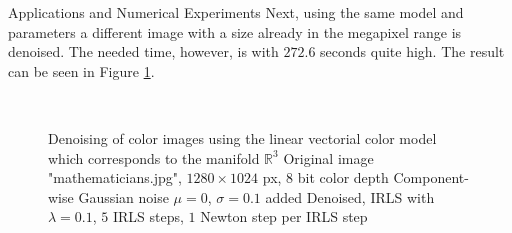 \begin{chapter}{Applications and Numerical Experiments}
Next, using the same model and parameters a different image with a size already in the megapixel range is denoised. The needed
time, however, is with $272.6$ seconds quite high. The result can be seen in Figure \ref{fig:application_color2}.\\

\begin{figure}[h!]
    \centering
    \\
    \caption[Large image "mathematicians" linear-vectorial denoising]{Denoising of color images using the linear vectorial color model which corresponds to the manifold $\mathbb{R}^3$
	 Original image "mathematicians.jpg", $1280\times 1024$ px, 8 bit color depth
	 Component-wise Gaussian noise $\mu=0$, $\sigma=0.1$ added
	 Denoised, IRLS with $\lambda=0.1$, $5$ IRLS steps, $1$ Newton step per IRLS step
	\label{fig:application_color2}
    }
\end{figure}


\end{chapter}

